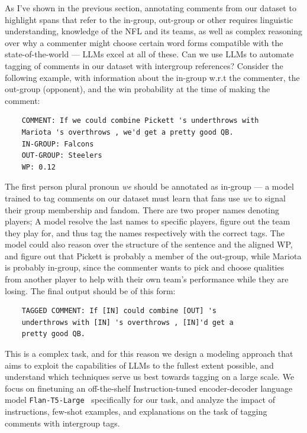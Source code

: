 As I've shown in the previous section, annotating comments from our dataset to highlight spans that refer to the in-group, out-group or other requires linguistic understanding, knowledge of the NFL and its teams, as well as complex reasoning over why a commenter might choose certain word forms compatible with the state-of-the-world --- LLMs excel at all of these. Can we use LLMs to automate tagging of comments in our dataset with intergroup references? Consider the following example, with information about the in-group w.r.t the commenter, the out-group (opponent), and the win probability at the time of making the comment:

\begin{verbatim}
    COMMENT: If we could combine Pickett 's underthrows with
    Mariota 's overthrows , we'd get a pretty good QB.
    IN-GROUP: Falcons
    OUT-GROUP: Steelers
    WP: 0.12
\end{verbatim}

The first person plural pronoun \emph{we} should be annotated as in-group --- a model trained to tag comments on our dataset must learn that fans use \emph{we} to signal their group membership and fandom. There are two proper names denoting players; A model resolve the last names to specific players, figure out the team they play for, and thus tag the names respectively with the correct tags. The model could also reason over the structure of the sentence and the aligned WP, and figure out that Pickett is probably a member of the out-group, while Mariota is probably in-group, since the commenter wants to pick and choose qualities from another player to help with their own team's performance while they are losing. The final output should be of this form:

\begin{verbatim}
    TAGGED COMMENT: If [IN] could combine [OUT] 's 
    underthrows with [IN] 's overthrows , [IN]'d get a 
    pretty good QB.
\end{verbatim}

This is a complex task, and for this reason we design a modeling approach that aims to exploit the capabilities of LLMs to the fullest extent possible, and understand which techniques serve us best towards tagging on a large scale. We focus on finetuning an off-the-shelf Instruction-tuned encoder-decoder language model \texttt{Flan-T5-Large}~\citep{Chung2022ScalingIL} specifically for our task, and analyze the impact of instructions, few-shot examples, and explanations on the task of tagging comments with intergroup tags.

